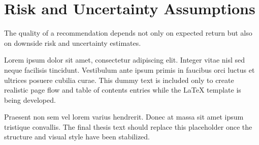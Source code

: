 \section{Risk and Uncertainty Assumptions}

The quality of a recommendation depends not only on expected return but also on downside risk and uncertainty estimates.

Lorem ipsum dolor sit amet, consectetur adipiscing elit. Integer vitae nisl sed neque facilisis tincidunt. Vestibulum ante ipsum primis in faucibus orci luctus et ultrices posuere cubilia curae. This dummy text is included only to create realistic page flow and table of contents entries while the LaTeX template is being developed.

Praesent non sem vel lorem varius hendrerit. Donec at massa sit amet ipsum tristique convallis. The final thesis text should replace this placeholder once the structure and visual style have been stabilized.

